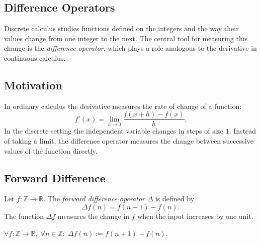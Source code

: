 
\subsection{Difference Operators}
\label{sec:difference-operators}

\begin{exposition}
Discrete calculus studies functions defined on the integers and the way
their values change from one integer to the next. The central tool for
measuring this change is the \emph{difference operator}, which plays a role
analogous to the derivative in continuous calculus.
\end{exposition}

\subsection*{Motivation}

\begin{exposition}
In ordinary calculus the derivative measures the rate of change of a function:
\[
f'(x) = \lim_{h\to 0} \frac{f(x+h)-f(x)}{h}.
\]
In the discrete setting the independent variable changes in steps of size
\(1\). Instead of taking a limit, the difference operator measures the change between
successive values of the function directly.
\end{exposition}

\subsection*{Forward Difference}

\begin{definition}
\label{def:forward-difference}
Let \(f : \mathbb{Z} \to \mathbb{R}\).
The \emph{forward difference operator} \(\Delta\) is defined by
\[
\Delta f(n) = f(n+1) - f(n).
\]
The function \(\Delta f\) measures the change in \(f\) when the input
increases by one unit.
\end{definition}

\DefinitionalRoot

\begin{remark*}
\(\forall f : \mathbb{Z}\to\mathbb{R},\; \forall n \in \mathbb{Z}:\;
\Delta f(n) := f(n+1) - f(n)\).
\end{remark*}

